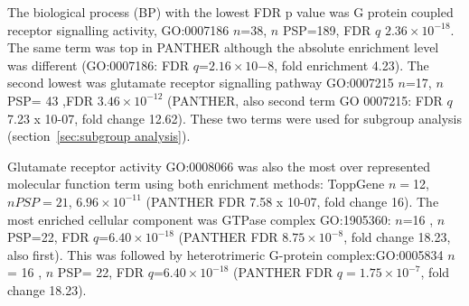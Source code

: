 The biological process (BP) with the lowest FDR p value was G protein coupled receptor signalling activity, GO:0007186 $n$=38, $n$ PSP=189, FDR $q$ $2.36 \times 10^{-18}$. The same term was top in PANTHER although the absolute enrichment level was different (GO:0007186: FDR $q$=$2.16\times10{-8}$, fold enrichment 4.23). The second lowest was  glutamate receptor signalling pathway  GO:0007215 $n$=17, $n$ PSP= 43 ,FDR $3.46 \times 10^{-12}$ (PANTHER, also second term GO 0007215: FDR $q$ 7.23 x 10-07, fold change 12.62). These two terms were used for subgroup analysis (section~\ref{sec:subgroup analysis}). 

Glutamate receptor activity GO:0008066 was also the most over represented molecular function term using both enrichment methods: ToppGene $n=$12,  $n PSP=21$,  $6.96 \times 10^{-11}$ (PANTHER FDR 7.58 x 10-07, fold change 16). The most enriched cellular component was GTPase complex GO:1905360: $n$=16 , $n$ PSP=22, FDR $q$=$6.40 \times 10^{-18}$ (PANTHER FDR $8.75\times10^{-8}$, fold change 18.23, also first). This was followed by heterotrimeric G-protein complex:GO:0005834 $n$= 16 , $n$ PSP= 22, FDR $q$=$6.40 \times 10^{-18}$ (PANTHER FDR $q=1.75\times 10^{-7}$, fold change 18.23).


